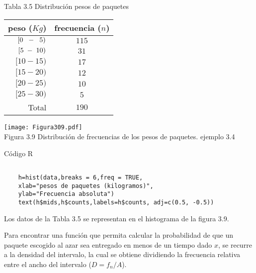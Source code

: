 \documentclass[base=hide,12pt]{elegantbook}
\begin{document}
	\begin{center}
Tabla 3.5 Distribución pesos de paquetes\\
{\footnotesize 
		\begin{tabular}{rc}\hline
			peso ($Kg$)& frecuencia ($n$)\\
			\hline
			$[0 \hspace{.2cm}- \hspace{.2cm} 5)$    &  $115$ \\ %
			$[5 \hspace{.1cm}- \hspace{.1cm} 10)$   &  $31$ \\ %
			$[10 - 15)$  &  $17$  \\ %
			$[15 - 20)$	 &  $12$  \\ %
			$[20 - 25)$	 &  $10$  \\ %
			$[25 - 30)$	 &  $5$   \\ \hline
			Total	     &  $190$ \\
			\hline	  
		\end{tabular}
	}
	\end{center}


\begin{center}
\texttt{[image: Figura309.pdf]} \\
Figura 3.9 Distribución de frecuencias de los pesos de paquetes. ejemplo 3.4
\end{center}

\begin{Box3}{Código R}
{\small	
\begin{verbatim}
	
	h=hist(data,breaks = 6,freq = TRUE,
	xlab="pesos de paquetes (kilogramos)",
	ylab="Frecuencia absoluta")
	text(h$mids,h$counts,labels=h$counts, adj=c(0.5, -0.5))
\end{verbatim}
}
\end{Box3}
	
Los datos de la Tabla 3.5 se representan en el histograma de la figura 3.9. 

Para encontrar una función que permita calcular la probabilidad de que un paquete escogido al azar sea entregado en menos de un tiempo dado $x$, se recurre a la densidad del intervalo, la  cual  se obtiene dividiendo la frecuencia relativa entre el ancho del intervalo ($D=f_n/A$). \\
%
\end{document}
